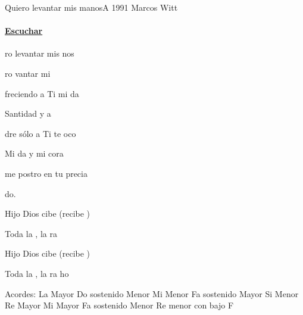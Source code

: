 \documentclass[12pt, spanish]{book}
\begin{document}
    \begin{song}{Quiero levantar mis manos}{A}
    {1991} %
    {Marcos Witt}
    {} %
    {}
        \ifChordBk
            \paragraph{\mbox{}\hfill\protect\href{https://open.spotify.com/intl-es/track/3F3cpazSaWY0DCb6XjSBd9}{Escuchar}\mbox{}\hfill}
        \fi

        \begin{SBOpGroup}
            ro levantar mis nos

            ro vantar mi 

            freciendo a Ti mi da

             Santidad y a

            dre sólo a Ti te oco

            Mi da y mi cora

             me postro en tu precia

             do.
        \end{SBOpGroup}

        \begin{SBChorus}
            Hijo  Dios  cibe  (recibe )

            Toda la , la ra  

            Hijo  Dios  cibe (recibe )

            Toda la , la ra  ho
        \end{SBChorus}

        \ifChordBk
        \begin{SBOpGroup}
            Acordes:\break
            \upchord{\A}\qquad La Mayor \hfill
            \upchord{\Csm}\qquad Do sostenido Menor \hfill\null\break
            \upchord{\Em}\qquad Mi Menor \hfill
            \upchord{\Fs}\qquad Fa sostenido Mayor \hfill\null\break
            \upchord{\Bm}\qquad Si Menor \hfill
            \upchord{\D}\qquad Re Mayor \hfill\null\break
            \upchord{\E}\qquad Mi Mayor \hfill
            \upchord{\Fsm}\qquad Fa sostenido Menor \hfill\null\break
            \upchord{\DmF}\qquad Re menor con bajo F \hfill\null\break
        \end{SBOpGroup}
        \fi
    \end{song}
\end{document}
